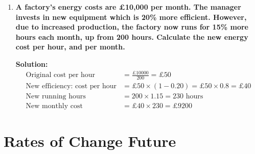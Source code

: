 \documentclass[12pt]{article}
\begin{document}
\begin{enumerate}[resume]
\begin{enumerate}
        \item \textbf{What is the total number of shares at the end of the third day?}
        \[
        200 + 230 + 265 = 695 \text{ shares}
        \]
    \end{enumerate}
    
    \item \textbf{A factory's energy costs are £10,000 per month. The manager invests in new equipment which is 20\% more efficient. However, due to increased production, the factory now runs for 15\% more hours each month, up from 200 hours. Calculate the new energy cost per hour, and per month.}
    
    \textbf{Solution:}
    \begin{align*}
        \text{Original cost per hour} &= \frac{£10000}{200} = £50 \\
        \text{New efficiency: cost per hour} &= £50 \times (1 - 0.20) = £50 \times 0.8 = £40 \\
        \text{New running hours} &= 200 \times 1.15 = 230 \text{ hours} \\
        \text{New monthly cost} &= £40 \times 230 = £9200
    \end{align*}
\end{enumerate}

\section*{Rates of Change Future}
\end{document}
